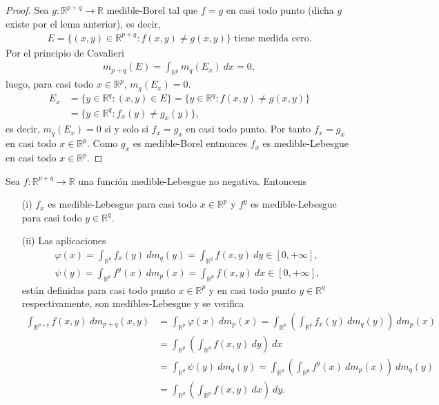 \begin{proof}
Sea $g: \mathbb{R}^{p+q} \longrightarrow \mathbb{R}$ medible-Borel tal que $f=g$ en casi todo punto (dicha $g$ existe por el lema anterior), es decir,
\begin{align*}
    E = \{ (x,y) \in \mathbb{R}^{p+q} : f(x,y) \not = g(x,y) \} \text{ tiene medida cero}.
\end{align*}
Por el principio de Cavalieri
\begin{align*}
    m_{p+q}(E) = \int_{\mathbb{R}^p}{m_q(E_x) \ dx} = 0,
\end{align*}
luego, para casi todo $x \in \mathbb{R}^p$, $m_q(E_x) = 0$.
\begin{align*}
    E_x &= \{ y \in \mathbb{R}^q : (x,y) \in E \} = \{ y \in \mathbb{R}^q : f(x,y) \not = g(x,y) \} \\
    &= \{ y \in \mathbb{R}^q : f_x(y) \not = g_x(y) \},
\end{align*}
es decir, $m_q(E_x) = 0$ si y solo si $f_x = g_x$ en casi todo punto. Por tanto $f_x = g_x$ en casi todo $x \in \mathbb{R}^p$. Como $g_x$ es medible-Borel entnonces $f_x$ es medible-Lebesgue en casi todo $x \in \mathbb{R}^p$. 
\end{proof}

\begin{teo}
Sea $f: \mathbb{R}^{p+q} \longrightarrow \mathbb{R}$ una función medible-Lebesgue no negativa. Entoncens
\begin{enumerate}
    \item[(i)] $f_x$ es medible-Lebesgue para casi todo $x \in \mathbb{R}^p$ y $f^y$ es medible-Lebesgue para casi todo $y \in \mathbb{R}^q$.
    \item[(ii)] Las aplicaciones
    \begin{align*}
        \varphi(x) = \int_{\mathbb{R}^q}{f_x(y) \ dm_q(y)} = \int_{\mathbb{R}^q}{f(x,y) \ dy} \in [0,+\infty],\\
        \psi(y) = \int_{\mathbb{R}^p}{f^y(x) \ dm_p(x)} = \int_{\mathbb{R}^p}{f(x,y) \ dx} \in [0,+\infty],
    \end{align*}
    están definidas para casi todo punto $x \in \mathbb{R}^{p}$ y en casi todo punto $y \in \mathbb{R}^{q}$ respectivamente, son medibles-Lebesgue y se verifica
    \begin{align*}
        \int_{\mathbb{R}^{p+q}}{f(x,y) \ dm_{p+q}(x,y)} &= \int_{\mathbb{R}^p}{\varphi(x) \ dm_p(x)} = \int_{\mathbb{R}^p}\left( \int_{\mathbb{R}^q}{f_x(y) \ dm_q(y)} \right) \ dm_p(x) \\
        &= \int_{\mathbb{R}^p}\left( \int_{\mathbb{R}^q}{f(x,y) \ dy} \right) \ dx \\
        &= \int_{\mathbb{R}^q}{\psi(y) \ dm_q(y)} = \int_{\mathbb{R}^q}\left( \int_{\mathbb{R}^p}{f^y(x) \ dm_p(x)} \right) \ dm_q(y)\\
        &= \int_{\mathbb{R}^q}\left( \int_{\mathbb{R}^p}{f(x,y) \ dx} \right) \ dy.
    \end{align*}
\end{enumerate}
\end{teo}

